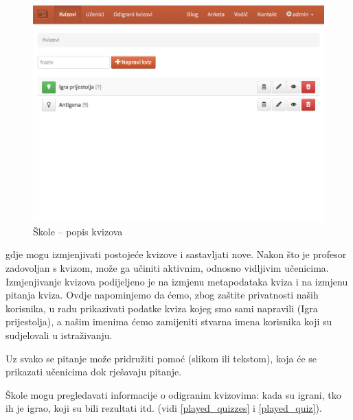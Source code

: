 \documentclass{scrreprt}
\begin{document}
\begin{figure}[H]
  \includegraphics[width=\textwidth, clip=true, trim=0 10cm 0 0, fbox]{school/quizzes}
  \caption{Škole -- popis kvizova}
  \label{fig:school/quizzes}
\end{figure}

gdje mogu izmjenjivati postojeće kvizove i sastavljati nove. Nakon što je
profesor zadovoljan s kvizom, može ga učiniti aktivnim, odnosno vidljivim
učenicima. Izmjenjivanje kvizova podijeljeno je na izmjenu metapodataka kviza i
na izmjenu pitanja kviza. Ovdje napominjemo da ćemo, zbog zaštite privatnosti
naših korisnika, u radu prikazivati podatke kviza kojeg smo sami napravili
(Igra prijestolja), a našim imenima ćemo zamijeniti stvarna imena korisnika
koji su sudjelovali u istraživanju.

Uz svako se pitanje može pridružiti pomoć (slikom ili tekstom), koja će se
prikazati učenicima dok rješavaju pitanje.

Škole mogu pregledavati informacije o odigranim kvizovima: kada su igrani, tko
ih je igrao, koji su bili rezultati itd. (vidi \ref{played_quizzes} i \ref{played_quiz}).
\end{document}
